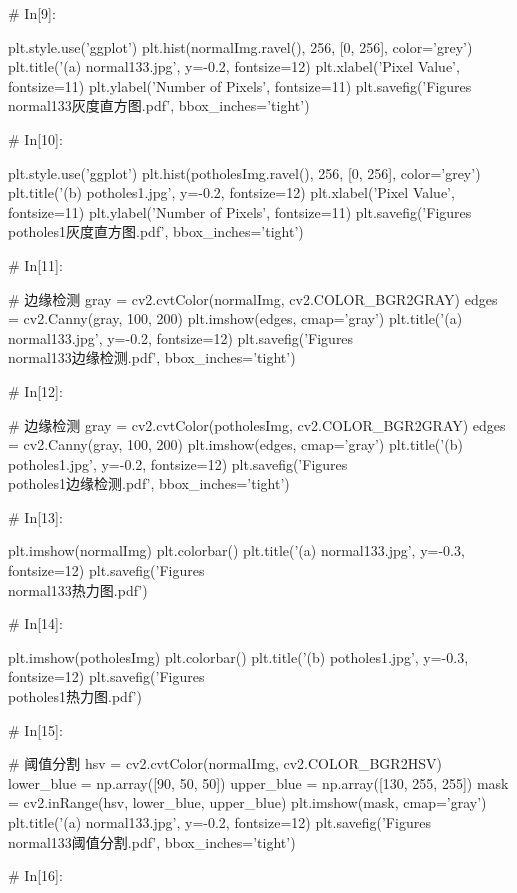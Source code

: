 \documentclass{MathorCupmodeling}
\begin{document}
\begin{python}
# In[9]:


plt.style.use('ggplot')
plt.hist(normalImg.ravel(), 256, [0, 256], color='grey')
plt.title('(a) normal133.jpg', y=-0.2, fontsize=12)
plt.xlabel('Pixel Value', fontsize=11)
plt.ylabel('Number of Pixels', fontsize=11)
plt.savefig('Figures\\normal133灰度直方图.pdf', bbox_inches='tight')

# In[10]:


plt.style.use('ggplot')
plt.hist(potholesImg.ravel(), 256, [0, 256], color='grey')
plt.title('(b) potholes1.jpg', y=-0.2, fontsize=12)
plt.xlabel('Pixel Value', fontsize=11)
plt.ylabel('Number of Pixels', fontsize=11)
plt.savefig('Figures\\potholes1灰度直方图.pdf', bbox_inches='tight')

# In[11]:


# 边缘检测
gray = cv2.cvtColor(normalImg, cv2.COLOR_BGR2GRAY)
edges = cv2.Canny(gray, 100, 200)
plt.imshow(edges, cmap='gray')
plt.title('(a) normal133.jpg', y=-0.2, fontsize=12)
plt.savefig('Figures\\normal133边缘检测.pdf', bbox_inches='tight')

# In[12]:


# 边缘检测
gray = cv2.cvtColor(potholesImg, cv2.COLOR_BGR2GRAY)
edges = cv2.Canny(gray, 100, 200)
plt.imshow(edges, cmap='gray')
plt.title('(b) potholes1.jpg', y=-0.2, fontsize=12)
plt.savefig('Figures\\potholes1边缘检测.pdf', bbox_inches='tight')

# In[13]:


plt.imshow(normalImg)
plt.colorbar()
plt.title('(a) normal133.jpg', y=-0.3, fontsize=12)
plt.savefig('Figures\\normal133热力图.pdf')

# In[14]:


plt.imshow(potholesImg)
plt.colorbar()
plt.title('(b) potholes1.jpg', y=-0.3, fontsize=12)
plt.savefig('Figures\\potholes1热力图.pdf')

# In[15]:


# 阈值分割
hsv = cv2.cvtColor(normalImg, cv2.COLOR_BGR2HSV)
lower_blue = np.array([90, 50, 50])
upper_blue = np.array([130, 255, 255])
mask = cv2.inRange(hsv, lower_blue, upper_blue)
plt.imshow(mask, cmap='gray')
plt.title('(a) normal133.jpg', y=-0.2, fontsize=12)
plt.savefig('Figures\\normal133阈值分割.pdf', bbox_inches='tight')

# In[16]:



\end{python}
\end{document}
